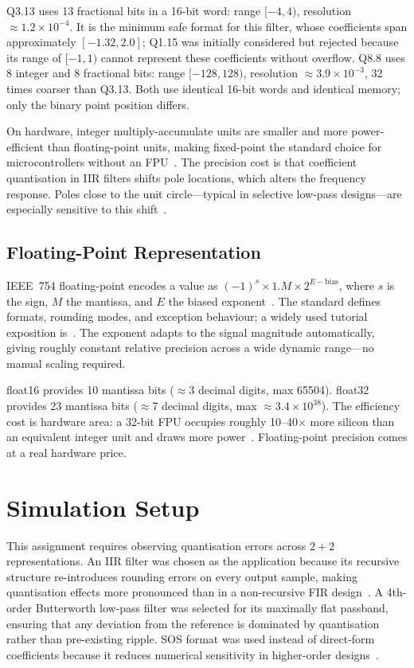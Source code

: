 \documentclass[conference]{IEEEtran}
\begin{document}
Q3.13 uses 13 fractional bits in a 16-bit word: range $[-4,4)$, resolution $\approx 1.2\times 10^{-4}$. It is the minimum safe format for this filter, whose coefficients span approximately $[-1.32,2.0]$; Q1.15 was initially considered but rejected because its range of $[-1,1)$ cannot represent these coefficients without overflow. Q8.8 uses 8 integer and 8 fractional bits: range $[-128,128)$, resolution $\approx 3.9\times 10^{-3}$, 32 times coarser than Q3.13. Both use identical 16-bit words and identical memory; only the binary point position differs.

On hardware, integer multiply-accumulate units are smaller and more power-efficient than floating-point units, making fixed-point the standard choice for microcontrollers without an FPU~\cite{analog2007}. The precision cost is that coefficient quantisation in IIR filters shifts pole locations, which alters the frequency response. Poles close to the unit circle---typical in selective low-pass designs---are especially sensitive to this shift~\cite{smith1997}.

\subsection{Floating-Point Representation}
IEEE~754 floating-point encodes a value as $(-1)^s \times 1.M \times 2^{E-\mathrm{bias}}$, where $s$ is the sign, $M$ the mantissa, and $E$ the biased exponent~\cite{ieee754}. The standard defines formats, rounding modes, and exception behaviour; a widely used tutorial exposition is~\cite{goldberg1991}. The exponent adapts to the signal magnitude automatically, giving roughly constant relative precision across a wide dynamic range---no manual scaling required.

float16 provides 10 mantissa bits ($\approx$3 decimal digits, max 65504). float32 provides 23 mantissa bits ($\approx$7 decimal digits, max $\approx 3.4\times 10^{38}$). The efficiency cost is hardware area: a 32-bit FPU occupies roughly 10--40$\times$ more silicon than an equivalent integer unit and draws more power~\cite{analog2007}. Floating-point precision comes at a real hardware price.

\section{Simulation Setup}
This assignment requires observing quantisation errors across $2{+}2$ representations. An IIR filter was chosen as the application because its recursive structure re-introduces rounding errors on every output sample, making quantisation effects more pronounced than in a non-recursive FIR design~\cite{smith1997}. A 4th-order Butterworth low-pass filter was selected for its maximally flat passband, ensuring that any deviation from the reference is dominated by quantisation rather than pre-existing ripple. SOS format was used instead of direct-form coefficients because it reduces numerical sensitivity in higher-order designs~\cite{oppenheim2010}.
\end{document}
